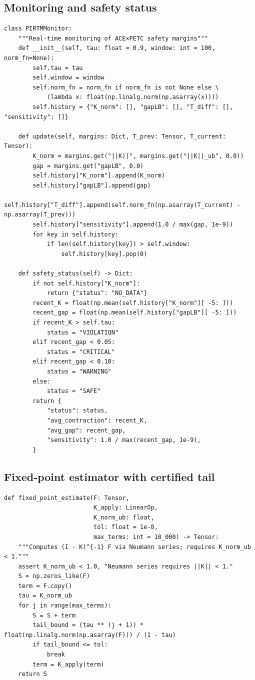\documentclass[11pt]{article}
\theoremstyle{definition}
\theoremstyle{remark}
\newcommand{\1}{\mathbf{1}}
\begin{document}
\subsection{Monitoring and safety status}
\begin{lstlisting}[style=py,caption={Real-time ACE margins monitor}]
class PIRTMMonitor:
    """Real-time monitoring of ACE×PETC safety margins"""
    def __init__(self, tau: float = 0.9, window: int = 100, norm_fn=None):
        self.tau = tau
        self.window = window
        self.norm_fn = norm_fn if norm_fn is not None else \
            (lambda x: float(np.linalg.norm(np.asarray(x))))
        self.history = {"K_norm": [], "gapLB": [], "T_diff": [], "sensitivity": []}

    def update(self, margins: Dict, T_prev: Tensor, T_current: Tensor):
        K_norm = margins.get("||K||", margins.get("||K||_ub", 0.0))
        gap = margins.get("gapLB", 0.0)
        self.history["K_norm"].append(K_norm)
        self.history["gapLB"].append(gap)
        self.history["T_diff"].append(self.norm_fn(np.asarray(T_current) - np.asarray(T_prev)))
        self.history["sensitivity"].append(1.0 / max(gap, 1e-9))
        for key in self.history:
            if len(self.history[key]) > self.window:
                self.history[key].pop(0)

    def safety_status(self) -> Dict:
        if not self.history["K_norm"]:
            return {"status": "NO_DATA"}
        recent_K = float(np.mean(self.history["K_norm"][ -5: ]))
        recent_gap = float(np.mean(self.history["gapLB"][ -5: ]))
        if recent_K > self.tau:
            status = "VIOLATION"
        elif recent_gap < 0.05:
            status = "CRITICAL"
        elif recent_gap < 0.10:
            status = "WARNING"
        else:
            status = "SAFE"
        return {
            "status": status,
            "avg_contraction": recent_K,
            "avg_gap": recent_gap,
            "sensitivity": 1.0 / max(recent_gap, 1e-9),
        }
\end{lstlisting}

\subsection{Fixed-point estimator with certified tail}
\begin{lstlisting}[style=py,caption={(I - K)^{-1}F via Neumann series with tail certificate}]
def fixed_point_estimate(F: Tensor,
                         K_apply: LinearOp,
                         K_norm_ub: float,
                         tol: float = 1e-8,
                         max_terms: int = 10_000) -> Tensor:
    """Computes (I - K)^{-1} F via Neumann series; requires K_norm_ub < 1."""
    assert K_norm_ub < 1.0, "Neumann series requires ||K|| < 1."
    S = np.zeros_like(F)
    term = F.copy()
    tau = K_norm_ub
    for j in range(max_terms):
        S = S + term
        tail_bound = (tau ** (j + 1)) * float(np.linalg.norm(np.asarray(F))) / (1 - tau)
        if tail_bound <= tol:
            break
        term = K_apply(term)
    return S
\end{lstlisting}
\end{document}
